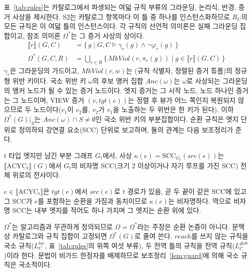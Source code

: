 표~\ref{tab:rules}는 카탈로그에서 파생되는 여덟 규칙 부류의 그라운딩, 논리식, 반경, 증거 사상을
제시한다. S2는 카탈로그 항목마다 이 틀 중 하나를 인스턴스화하므로 $R_C$의 모든 규칙은 이 여덟 틀의
인스턴스이다. 각 규칙의 선언적 의미론은 실패 그라운딩 집합이고, 참조 의미론 $\Omega^{*}$는 그 증거
사상의 상이다.
\begin{align}
\llbracket r \rrbracket(G, C) &= \{\, g \mid G, C \models \gamma_r(g) \wedge \neg\varphi_r(g) \,\}\\
\Omega^{*}(G, C, R) &= \bigcup_{r \in R}
   \{\, \mathit{MkViol}(r, \pi_r(g)) \mid g \in \llbracket r \rrbracket(G,C) \,\}
\end{align}
$\gamma_r$은 그라운딩의 가드이고, $\mathit{MkViol}(r,w)$는 (규칙 식별자, 정렬된 증거 튜플)의 정규형
위반 키이다. 국소 위반 키 $\omega$의 후보 앵커 집합 $\mathit{Anc}(\omega)$는 $\omega$로 사상되는 그라운딩의 앵커
노드가 될 수 있는 증거 노드이다. 엣지 증거는 그 시작 노드, 노드 하나인 증거는 그 노드이며, VIEW 증거
$(v, \mathit{tgt}(e))$는 정렬 후 뷰가 어느 쪽인지 복원되지 않으므로 두 노드이다($v_1$이 $v_2$를, $v_2$가 $v_1$을
노출하는 두 위반은 한 키가 된다). 이하 $\Omega^{*}(G)|_S$는 $\mathit{Anc}(\omega) \cap S \ne \emptyset$인 국소
위반 키의 부분집합이다. 순환 규칙은 엣지 단위로 정의하되 강연결 요소(SCC) 단위로
보고하며, 둘의 관계는 다음 보조정리가 준다.

\begin{joklem}\label{lem:scc}
$t$ 타입 엣지만 남긴 부분 그래프 $G_t$에서, 사상 $\kappa(e) = \mathrm{SCC}_{G_t}(\mathit{src}(e))$는
$\llbracket \mathrm{ACYC}_t \rrbracket(G)$에서 $G_t$의 비자명 SCC(크기 2 이상이거나 자기 루프를 가진
SCC) 전체 위로의 전사이다.
\end{joklem}

\begin{jokproof}
$e \in \llbracket \mathrm{ACYC}_t \rrbracket$은 $\mathit{tgt}(e)$에서 $\mathit{src}(e)$로 $t$ 경로가 있음,
곧 두 끝이 같은 SCC에 있고 그 SCC가 $e$를 포함하는 순환을 가짐과 동치이므로 $\kappa(e)$는 비자명하다.
역으로 비자명 SCC는 내부 엣지를 적어도 하나 가지며 그 엣지는 순환 위에 있다.
\end{jokproof}

$\Omega^{*}$는 알고리즘과 무관하게 정의되므로 $\Omega = \Omega^{*}$라는 주장은 순환 논증이 아니다. 문맥상
카탈로그와 규칙 집합이 고정되면 $\Omega^{*}(G)$로 줄여 쓴다. $\mathit{reach}$를 쓰지 않는 규칙을 국소
규칙($L_C^{\mathit{loc}}$, 표~\ref{tab:rules}의 위쪽 여섯 부류), 두 전역 틀의 규칙을 전역 규칙($L_C^{\mathit{glob}}$)이라
한다. 문법이 비가드 한정자를 배제하므로 보조정리~\ref{lem:guard}에 의해 국소 규칙은 국소적이다.

